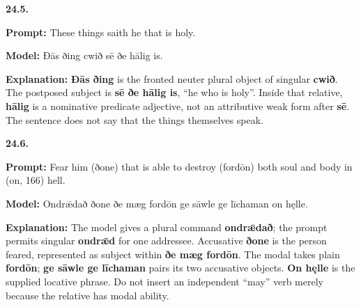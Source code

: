 \par\begin{minipage}{\linewidth}\raggedright
\textbf{24.5.}

\textbf{Prompt:} These things saith he that is holy.

\textbf{Model:} Ðās ðing cwið sē ðe hālig is.

\textbf{Explanation:} \textbf{Ðās ðing} is the fronted neuter plural object of singular \textbf{cwið}. The postposed subject is \textbf{sē ðe hālig is}, “he who is holy”. Inside that relative, \textbf{hālig} is a nominative predicate adjective, not an attributive weak form after \textbf{sē}. The sentence does not say that the things themselves speak.

\end{minipage}\par\addvspace{4pt}

\par\begin{minipage}{\linewidth}\raggedright
\textbf{24.6.}

\textbf{Prompt:} Fear him (ðone) that is able to destroy (fordōn) both soul and body in (on, 166) hell.

\textbf{Model:} Ondrǣdað ðone ðe mæg fordōn ge sāwle ge līchaman on hęlle.

\textbf{Explanation:} The model gives a plural command \textbf{ondrǣdað}; the prompt permits singular \textbf{ondrǣd} for one addressee. Accusative \textbf{ðone} is the person feared, represented as subject within \textbf{ðe mæg fordōn}. The modal takes plain \textbf{fordōn}; \textbf{ge sāwle ge līchaman} pairs its two accusative objects. \textbf{On hęlle} is the supplied locative phrase. Do not insert an independent “may” verb merely because the relative has modal ability.

\end{minipage}\par\addvspace{4pt}

